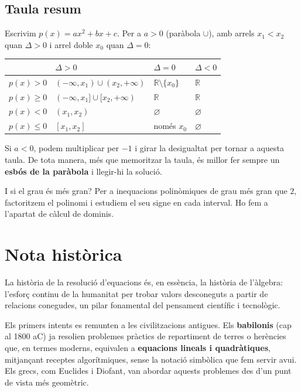 \subsection{Taula resum}

Escrivim $p(x)=ax^2+bx+c$. Per a $a>0$ (paràbola $\cup$), amb arrels $x_1<x_2$ quan $\Delta>0$ i arrel doble $x_0$ quan $\Delta=0$:

\begin{center}
\begin{tabular}{llll}
\toprule
 & ${\Delta>0}$ & ${\Delta=0}$ & ${\Delta<0}$ \\
\midrule
${p(x)>0}$ & $(-\infty,x_1)\cup(x_2,+\infty)$ & ${\mathbb{R}\setminus\{x_0\}}$ & $\mathbb{R}$ \\
${p(x)\geq 0}$ & $(-\infty,x_1]\cup[x_2,+\infty)$ & $\mathbb{R}$ & $\mathbb{R}$ \\
${p(x)<0}$ & $(x_1,x_2)$ & $\varnothing$ & $\varnothing$ \\
${p(x)\leq 0}$ & $[x_1,x_2]$ & només ${x_0}$ & $\varnothing$ \\
\bottomrule
\end{tabular}
\end{center}

Si $a<0$, podem multiplicar per $-1$ i girar la desigualtat per tornar a aquesta taula. De tota manera, més que memoritzar la taula, és millor fer sempre un \textbf{esbós de la paràbola} i llegir-hi la solució.

\begin{propietat}{I si el grau és més gran?}
Per a inequacions polinòmiques de grau més gran que $2$, factoritzem el polinomi i estudiem el seu signe en cada interval. Ho fem a l'apartat de càlcul de dominis.
\end{propietat}

\section{Nota històrica}

La història de la resolució d'equacions és, en essència, la història de l'àlgebra: l'esforç continu de la humanitat per trobar valors desconeguts a partir de relacions conegudes, un pilar fonamental del pensament científic i tecnològic.

Els primers intents es remunten a les civilitzacions antigues. Els \textbf{babilonis} (cap al 1800 aC) ja resolien problemes pràctics de repartiment de terres o herències que, en termes moderns, equivalen a \textbf{equacions lineals i quadràtiques}, mitjançant receptes algorítmiques, sense la notació simbòlica que fem servir avui. Els grecs, com Euclides i Diofant, van abordar aquests problemes des d'un punt de vista més geomètric.

